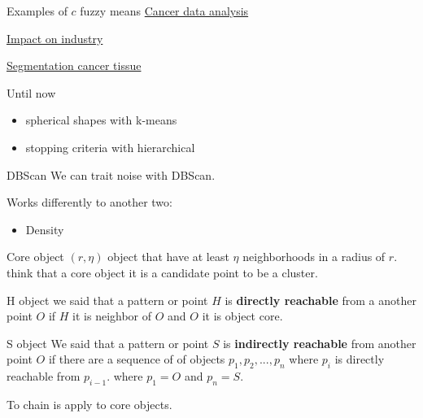 \documentclass{beamer}
\begin{document}
\begin{frame}{Examples of $c$ fuzzy means}
\href{
https://www.sciencedirect.com/science/article/abs/pii/S0957417421000634}{Cancer data analysis}

\href{https://www.sciencedirect.com/science/article/pii/S2352484720315195}{Impact on industry}

\href{https://www.sciencedirect.com/science/article/pii/S0010482520301293}{Segmentation cancer tissue}
\end{frame}


\begin{comment}
entails:
churn: batir, agitarse, 
recency:
engagement:
nesters:
hone in :
inching:
fancy: elegante.


topics to research greedy algorithm

\end{comment}


\begin{frame}{Until now}
\begin{itemize}
\item spherical shapes with k-means
\item stopping criteria with hierarchical
\end{itemize}


\end{frame}






\begin{frame}{DBScan}
We can trait noise with DBScan.

Works differently to another two:
\begin{itemize}
\item Density 
\end{itemize}


\end{frame}


\begin{frame}{Core object $(r,\eta)$}
object that have at least $\eta$ neighborhoods in a radius of $r$. think that a core object it is a candidate point to be a cluster.
\end{frame}

\begin{frame}{H object}
we said that a pattern or point $H$  is \textbf{directly reachable} from a 
another point $O$ if $H$ it is neighbor of $O$ and $O$ it is object core.
\end{frame}


\begin{frame}{S object}
We said that a pattern or point  $S$ is  \textbf{indirectly reachable} from another point $O$ if there are a sequence of of objects $p_{1},p_{2},...,p_{n}$ where $p_{i}$ is directly reachable from $p_{i-1}$. where $p_{1}=O$ and $p_{n}=S$.

To chain is apply to core objects.
\end{frame}
\end{document}
